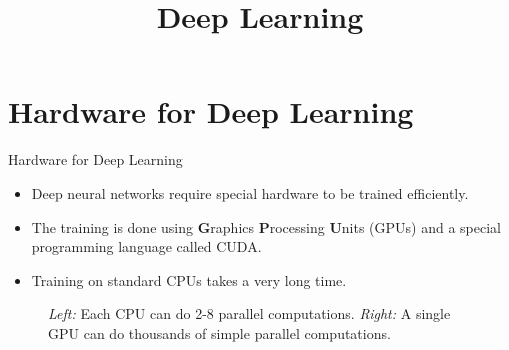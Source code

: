 





\newcommand{\titlefigure}{figure/backprop_gg_new.png}
\newcommand{\learninggoals}{
  \item 
  \item 
  \item 
}

\title{Deep Learning}
\date{}




\section{Hardware for Deep Learning}
\begin{frame} {Hardware for Deep Learning}
  \begin{itemize}
    \item Deep neural networks require special hardware to be trained efficiently.
    \item The training is done using \textbf{G}raphics \textbf{P}rocessing \textbf{U}nits (GPUs) and a special programming language called CUDA.
    \item Training on standard CPUs takes a very long time.
  \end{itemize}
\begin{figure}
    \centering
      \caption{\textit{Left:} Each CPU can do 2-8 parallel computations. \textit{Right:} A single GPU can do thousands of simple parallel computations.}
  \end{figure}
\end{frame}

